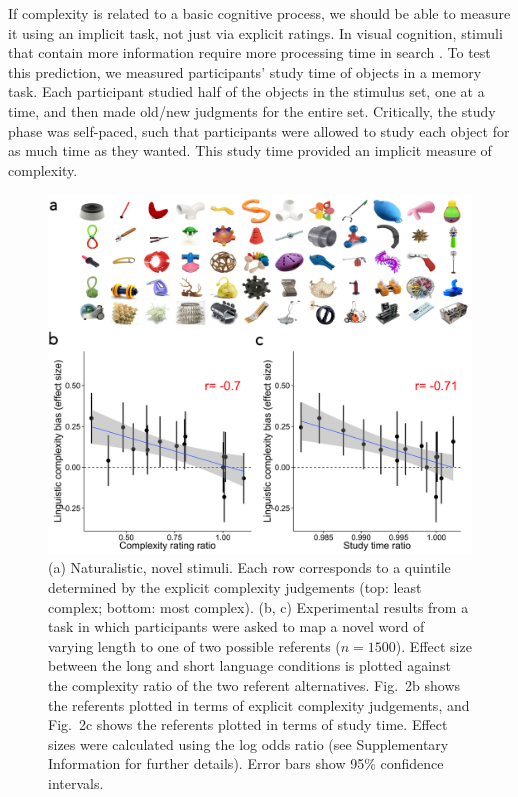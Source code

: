\documentclass[12pt]{article}
\begin{document}
	
If complexity is related to a basic cognitive process, we should be able to measure it using an implicit task, not just via explicit ratings. In visual cognition, stimuli that contain more information require more processing time in search \cite{alvarez2004capacity, hyman}. To test this prediction, we measured participants' study time of objects in a memory task. Each participant studied half of the objects in the stimulus set, one at a time, and then made old/new judgments for the entire set. Critically, the study phase was self-paced, such that participants were allowed to study each object for as much time as they wanted. This study time provided an implicit measure of complexity.

\begin{figure}[t!]
\begin{center}
\includegraphics{figs/FIG_2.png}
\caption{(a) Naturalistic, novel stimuli. Each row corresponds to a quintile determined by the explicit complexity judgements (top: least complex; bottom: most complex). (b, c) Experimental results from a task in which participants were asked to map a novel word of varying length to one of two possible referents ($n=1500$). Effect size between the long and short language conditions is plotted against the complexity ratio of the two referent alternatives. Fig.\ 2b shows the referents plotted in terms of explicit complexity judgements, and Fig.\ 2c shows the referents plotted in terms of study time. Effect sizes were calculated using the log odds ratio (see Supplementary Information for further details). Error bars show 95\% confidence intervals.}
\end{center}
\label{fig:real_objs}
\end{figure}
\end{document}
